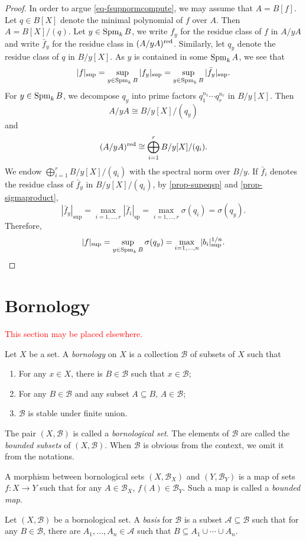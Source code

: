 \begin{proof}
    In order to argue \eqref{eq-fsupnormcompute}, we may assume that $A=B[f]$. Let $q\in B[X]$ denote the minimal polynomial of $f$ over $A$. Then $A=B[X]/(q)$. Let $y\in \operatorname{Spm}_k B$, we write $f_y$ for the residue class of $f$ in $A/yA$ and write $\bar{f}_y$ for the residue class in $(A/yA)^{\operatorname{red}}$. Similarly, let $q_y$ denote the residue class of $q$ in $B/y[X]$. As $y$ is contained in some $\operatorname{Spm}_k A$, we see that
    \[
        |f|_{\sup}=\sup_{y\in \operatorname{Spm}_k B} |f_y|_{\sup}=\sup_{y\in \operatorname{Spm}_k B} |\bar{f}_y|_{\sup}.  
    \]
    For $y\in \operatorname{Spm}_k B$, we decompose $q_y$ into prime factors $q_1^{n_1}\cdots q_r^{n_r}$ in $B/y[X]$. Then
    \[
        A/yA\cong B/y[X]/(q_y)  
    \]
    and
    \[
        (A/yA)^{\operatorname{red}}\cong \bigoplus_{i=1}^r B/y[X]/(q_i).
    \]
    We endow $\bigoplus_{i=1}^r B/y[X]/(q_i)$ with the spectral norm over $B/y$. If $\bar{f}_i$ denotes the residue class of $\bar{f}_y$ in $B/y[X]/(q_i)$, by \cref{prop-supeqsp} and \cref{prop-sigmaproduct},
    \[
        |\bar{f}_y|_{\sup}=\max_{i=1,\ldots,r} |\bar{f}_i|_{\mathrm{sp}} = \max_{i=1,\ldots,r} \sigma(q_i)=\sigma(q_y).   
    \]
    Therefore, 
    \[
      |f|_{\sup}=\sup_{y\in \operatorname{Spm}_k B}\sigma(q_y)=\max_{i=1,\ldots,n} |b_i|_{\sup}^{1/n}.  
    \]
\end{proof}


\section{Bornology}
\textcolor{red}{This section may be placed elsewhere.}
\begin{definition}
    Let $X$ be a set. A \emph{bornology} on $X$ is a collection $\mathcal{B}$ of subsets of $X$ such that
    \begin{enumerate}
        \item For any $x\in X$, there is $B\in \mathcal{B}$ such that $x\in \mathcal{B}$;
        \item For any $B\in \mathcal{B}$ and any subset $A\subseteq B$, $A\in \mathcal{B}$;
        \item $\mathcal{B}$ is stable under finite union.
    \end{enumerate}

    The pair $(X,\mathcal{B})$ is called a \emph{bornological set}. The elements of $\mathcal{B}$ are called the \emph{bounded subsets} of $(X,\mathcal{B})$. When $\mathcal{B}$ is obvious from the context, we omit it from the notations.
    
    A morphism between bornological sets $(X,\mathcal{B}_X)$ and $(Y,\mathcal{B}_Y)$ is a map of sets $f:X\rightarrow Y$ such that for any $A\in \mathcal{B}_X$, $f(A)\in \mathcal{B}_Y$. Such a map is called a \emph{bounded map}.
\end{definition}
\begin{definition}
    Let $(X,\mathcal{B})$ be a bornological set. A \emph{basis} for $\mathcal{B}$ is a subset $\mathcal{A}\subseteq \mathcal{B}$ such that for any $B\in \mathcal{B}$, there are $A_1,\ldots,A_n\in \mathcal{A}$ such that $B\subseteq A_1\cup\cdots\cup A_n$.
\end{definition}

\printbibliography
